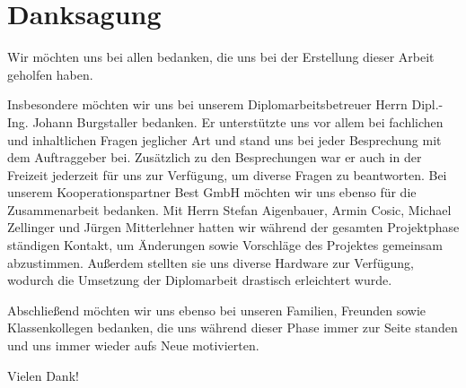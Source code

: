 \chapter*{Danksagung} 

Wir möchten uns bei allen bedanken, die uns bei der Erstellung dieser Arbeit geholfen haben.

Insbesondere möchten wir uns bei unserem Diplomarbeitsbetreuer Herrn Dipl.-Ing. Johann Burgstaller bedanken. Er unterstützte uns vor allem bei fachlichen und inhaltlichen Fragen jeglicher Art und stand uns bei jeder Besprechung mit dem Auftraggeber bei. Zusätzlich zu den Besprechungen war er auch in der Freizeit jederzeit für uns zur Verfügung, um diverse Fragen zu beantworten.
Bei unserem Kooperationspartner Best GmbH möchten wir uns ebenso für die Zusammenarbeit bedanken. Mit Herrn Stefan Aigenbauer, Armin Cosic, Michael Zellinger und Jürgen Mitterlehner hatten wir während der gesamten Projektphase ständigen Kontakt, um Änderungen sowie Vorschläge des Projektes gemeinsam abzustimmen. Außerdem stellten sie uns diverse Hardware zur Verfügung, wodurch die Umsetzung der Diplomarbeit drastisch erleichtert wurde.

Abschließend möchten wir uns ebenso bei unseren Familien, Freunden sowie Klassenkollegen bedanken, die uns während dieser Phase immer zur Seite standen und uns immer wieder aufs Neue motivierten.

Vielen Dank!

